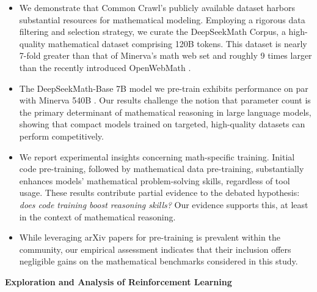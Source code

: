 \begin{itemize}[topsep=0pt]
    \item We demonstrate that Common Crawl’s publicly available dataset harbors substantial resources for mathematical modeling. Employing a rigorous data filtering and selection strategy, we curate the DeepSeekMath Corpus, a high-quality mathematical dataset comprising 120B tokens. This dataset is nearly 7-fold greater than that of Minerva’s math web set \citep{minerva} and roughly 9 times larger than the recently introduced OpenWebMath \citep{openwebmath}.

    \item The DeepSeekMath-Base 7B model we pre-train exhibits performance on par with Minerva 540B \citep{minerva}. Our results challenge the notion that parameter count is the primary determinant of mathematical reasoning in large language models, showing that compact models trained on targeted, high-quality datasets can perform competitively.

    \item We report experimental insights concerning math-specific training. Initial code pre-training, followed by mathematical data pre-training, substantially enhances models' mathematical problem-solving skills, regardless of tool usage. These results contribute partial evidence to the debated hypothesis: \textit{does code training boost reasoning skills?} Our evidence supports this, at least in the context of mathematical reasoning.

    \item While leveraging arXiv papers for pre-training is prevalent within the community, our empirical assessment indicates that their inclusion offers negligible gains on the mathematical benchmarks considered in this study.
\end{itemize}

\textbf{Exploration and Analysis of Reinforcement Learning}

